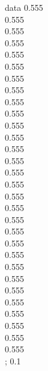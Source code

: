 {{data
0.555 \\
0.555 \\
0.555 \\
0.555 \\
0.555 \\
0.555 \\
0.555 \\
0.555 \\
0.555 \\
0.555 \\
0.555 \\
0.555 \\
0.555 \\
0.555 \\
0.555 \\
0.555 \\
0.555 \\
0.555 \\
0.555 \\
0.555 \\
0.555 \\
0.555 \\
0.555 \\
0.555 \\
0.555 \\
0.555 \\
0.555 \\
0.555 \\
0.555 \\
0.555 \\
};
}{0.1}

